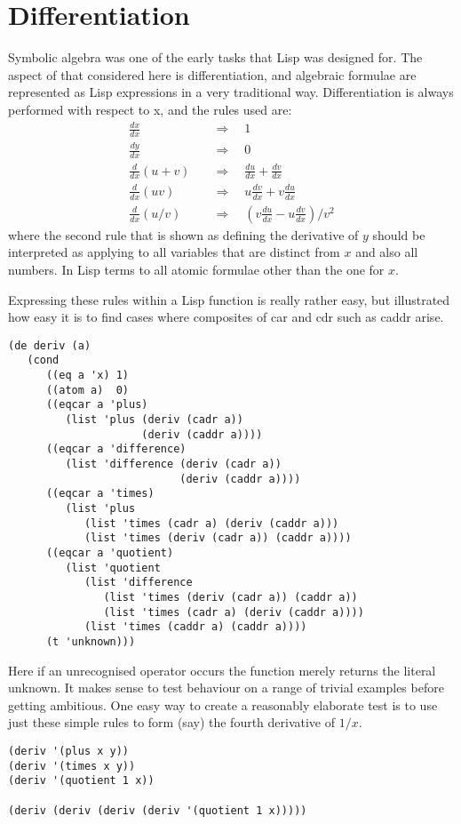 \section{Differentiation}
Symbolic algebra was one of the early tasks that Lisp was designed for.
The aspect of that considered here is differentiation, and algebraic
formulae are represented as Lisp expressions in a very traditional
way. Differentiation is always performed with respect to {\tx x}, and
the rules used are:
\begin{align*}
\frac{dx}{dx} \quad & \Rightarrow \quad 1 \\
\frac{dy}{dx} \quad & \Rightarrow \quad 0 \\
\frac{d}{dx} (u + v) \quad & \Rightarrow \quad \frac{du}{dx} + \frac{dv}{dx} \\
\frac{d}{dx} (u v) \quad & \Rightarrow \quad u \frac{dv}{dx} + v \frac{du}{dx} \\
\frac{d}{dx} (u / v) \quad & \Rightarrow \quad (v \frac{du}{dx} - u \frac{dv}{dx}) / v^{2}
\end{align*}
where the second rule that is shown as defining the derivative of $y$ should
be interpreted as applying to all variables that are distinct from $x$ and also
all numbers. In Lisp terms to all atomic formulae other than the one for $x$.

Expressing these rules within a Lisp function is really rather easy, but
illustrated how easy it is to find cases where composites of {\tx car} and
{\tx cdr} such as {\tx caddr} arise.
{\small\begin{verbatim}
(de deriv (a)
   (cond
      ((eq a 'x) 1)
      ((atom a)  0)
      ((eqcar a 'plus)
         (list 'plus (deriv (cadr a))
                     (deriv (caddr a))))
      ((eqcar a 'difference)
         (list 'difference (deriv (cadr a))
                           (deriv (caddr a))))
      ((eqcar a 'times)
         (list 'plus
            (list 'times (cadr a) (deriv (caddr a)))
            (list 'times (deriv (cadr a)) (caddr a))))
      ((eqcar a 'quotient)
         (list 'quotient
            (list 'difference
               (list 'times (deriv (cadr a)) (caddr a))
               (list 'times (cadr a) (deriv (caddr a))))
            (list 'times (caddr a) (caddr a))))
      (t 'unknown)))
\end{verbatim}}

Here if an unrecognised operator occurs the function merely returns the
literal {\tx unknown}. It makes sense to test behaviour on a range of
trivial examples before getting ambitious. One easy way to create
a reasonably elaborate test is to use just these simple rules to
form (say) the fourth derivative of $1/x$. 
{\small\begin{verbatim}
(deriv '(plus x y))
(deriv '(times x y))
(deriv '(quotient 1 x))

(deriv (deriv (deriv (deriv '(quotient 1 x)))))
\end{verbatim}}

